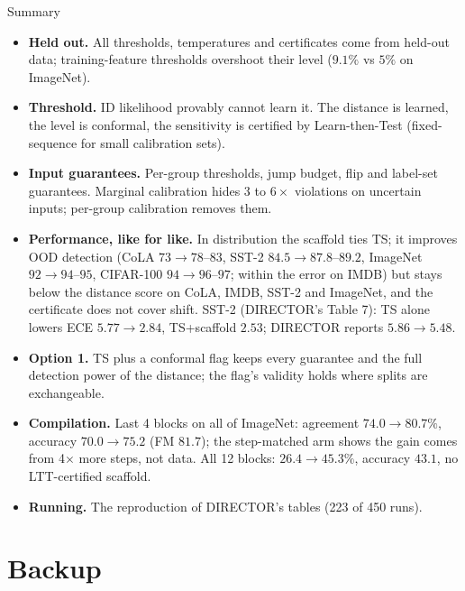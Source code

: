 \documentclass[aspectratio=169,11pt]{beamer}
\begin{document}
\begin{frame}{Summary}
  \footnotesize
  \begin{itemize}
    \item \textbf{Held out.} All thresholds, temperatures and certificates come from held-out data; training-feature thresholds overshoot their level ($9.1\%$ vs $5\%$ on ImageNet).
    \item \textbf{Threshold.} ID likelihood provably cannot learn it. The distance is learned, the level is conformal, the sensitivity is certified by Learn-then-Test (fixed-sequence for small calibration sets).
    \item \textbf{Input guarantees.} Per-group thresholds, jump budget, flip and label-set guarantees. Marginal calibration hides 3 to $6\times$ violations on uncertain inputs; per-group calibration removes them.
    \item \textbf{Performance, like for like.} In distribution the scaffold ties TS; it improves OOD detection (CoLA $73\to78$--$83$, SST-2 $84.5\to87.8$--$89.2$, ImageNet $92\to94$--$95$, CIFAR-100 $94\to96$--$97$; within the error on IMDB) but stays below the distance score on CoLA, IMDB, SST-2 and ImageNet, and the certificate does not cover shift. SST-2 (DIRECTOR's Table 7): TS alone lowers ECE $5.77\to2.84$, TS+scaffold $2.53$; DIRECTOR reports $5.86\to5.48$.
    \item \textbf{Option 1.} TS plus a conformal flag keeps every guarantee and the full detection power of the distance; the flag's validity holds where splits are exchangeable.
    \item \textbf{Compilation.} Last 4 blocks on all of ImageNet: agreement $74.0\to80.7\%$, accuracy $70.0\to75.2$ (FM $81.7$); the step-matched arm shows the gain comes from 4$\times$ more steps, not data. All 12 blocks: $26.4\to45.3\%$, accuracy $43.1$, no LTT-certified scaffold.
    \item \textbf{Running.} The reproduction of DIRECTOR's tables (223 of 450 runs).
  \end{itemize}
\end{frame}

\appendix
\section*{Backup}
\end{document}
